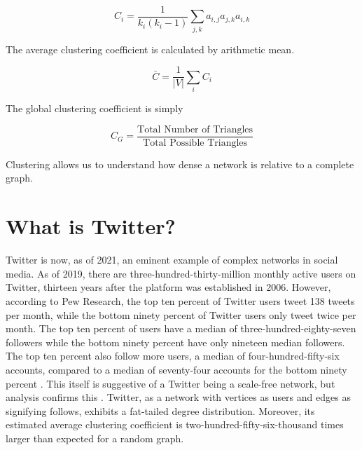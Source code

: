$$
C_i =\frac{1}{k_i(k_i-1)} \sum_{j,k} a_{i,j}a_{j,k}a_{i,k}
$$

\noindent The average clustering coefficient is calculated by arithmetic mean.

$$
{\bar C} = \frac{1}{|V|}\sum_{i} C_i
$$

\noindent The global clustering coefficient is simply

$$
C_{G} = \frac{\text{Total Number of Triangles}}{\text{Total Possible Triangles}}
$$

\noindent Clustering allows us to understand how dense a network is relative to a complete graph. 

\section{What is Twitter?}
\label{section:Twitter}
Twitter is now, as of 2021, an eminent example of complex networks in social media.
As of 2019, there are three-hundred-thirty-million monthly active users on Twitter, thirteen years after the platform was
established in 2006. However, according to Pew Research, the top ten percent of Twitter users tweet 138 
tweets per month, while the bottom ninety percent of Twitter users only tweet twice per month. The top ten percent of users
have a median of three-hundred-eighty-seven followers while the bottom ninety percent have only nineteen median followers. The top ten percent
also follow more users, a median of four-hundred-fifty-six accounts, compared to a median of seventy-four accounts for the bottom ninety percent \cite{wojcik2019sizing}.
This itself is suggestive of a Twitter being a scale-free network, but analysis confirms this \cite{Aparicio}. Twitter, as a network
with vertices as users and edges as signifying follows, exhibits a fat-tailed degree distribution. Moreover, its estimated
average clustering coefficient is two-hundred-fifty-six-thousand times larger than expected for a random graph.


